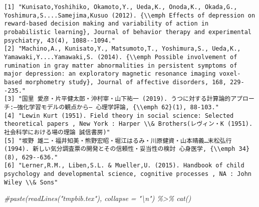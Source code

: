 \documentclass[11pt,a4paper,xelatex,ja=standard]{bxjsarticle}
\newenvironment{Shaded}{\begin{snugshade}}{\end{snugshade}}
\newcommand{\CommentTok}[1]{\textcolor[rgb]{0.56,0.35,0.01}{\textit{#1}}}
\begin{document}
\begin{verbatim}
[1] "Kunisato,Yoshihiko, Okamoto,Y., Ueda,K., Onoda,K., Okada,G., Yoshimura,S....Samejima,Kusuo (2012). {\\emph Effects of depression on reward-based decision making and variability of action in probabilistic learning}, Journal of behavior therapy and experimental psychiatry, 43(4), 1088--1094."                                          
[2] "Machino,A., Kunisato,Y., Matsumoto,T., Yoshimura,S., Ueda,K., Yamawaki,Y....Yamawaki,S. (2014). {\\emph Possible involvement of rumination in gray matter abnormalities in persistent symptoms of major depression: an exploratory magnetic resonance imaging voxel-based morphometry study}, Journal of affective disorders, 168, 229--235."
[3] "国里 愛彦・片平健太郎・沖村宰・山下祐一 (2019). うつに対する計算論的アプローチ:―強化学習モデルの観点から― 心理学評論, {\\emph 62}(1), 88-103."                                                                                                                                                                                             
[4] "Lewin Kurt (1951). Field theory in social science: Selected theoretical papers , New York : Harper \\& Brothers(レヴィン・K (1951). 社会科学における場の理論 誠信書房)"                                                                                                                                                                      
[5] "坂野 雄二・福井知美・熊野宏昭・堀江はるみ・川原健資・山本晴義…末松弘行 (1994). 新しい気分調査票の開発とその信頼性・妥当性の検討 心身医学, {\\emph 34}(8), 629--636."                                                                                                                                                                        
[6] "Lerner,R.M., Liben,S.L. & Mueller,U. (2015). Handbook of child psychology and developmental science, cognitive processes , NA : John Wiley \\& Sons"                                                                                                                                                                                         
\end{verbatim}

\begin{Shaded}
\begin{Highlighting}[]
\CommentTok{\#paste(readLines("tmpbib.tex"), collapse = "\textbackslash{}n") \%\textgreater{}\% cat()}
\end{Highlighting}
\end{Shaded}
\end{document}
